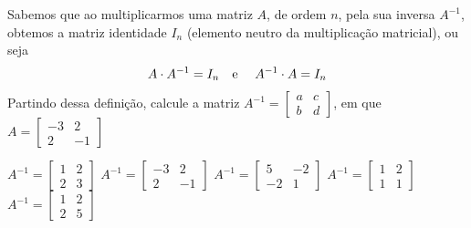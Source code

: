 Sabemos que ao multiplicarmos uma matriz $A$, de ordem $n$, pela sua inversa $A^{-1}$, obtemos a matriz identidade $I_n$ (elemento neutro da multiplicação matricial), ou seja
\[A\cdot A^{-1}=I_n\textnormal{\quad e \quad}A^{-1}\cdot A=I_n \]
Partindo dessa definição, calcule a matriz $A^{-1}=\left[ \begin{array}{cc}
a   &  c \\
b   &  d
\end{array} \right]$, em que $A = \left[ \begin{array}{cc}
-3  &   2\\
2  &  -1
\end{array} \right]$

$A^{-1} = \left[ \begin{array}{cc} 1  &  2\\ 2  &  3 \end{array} \right]$
$A^{-1} = \left[ \begin{array}{cc} -3  &  2\\ 2  & -1 \end{array} \right]$
$A^{-1} = \left[ \begin{array}{cc} 5  & -2\\ -2  &  1 \end{array} \right]$
$A^{-1} = \left[ \begin{array}{cc} 1   &  2\\ 1  &   1 \end{array} \right]$
$A^{-1} = \left[ \begin{array}{cc} 1   &  2\\ 2  &   5 \end{array} \right]$


